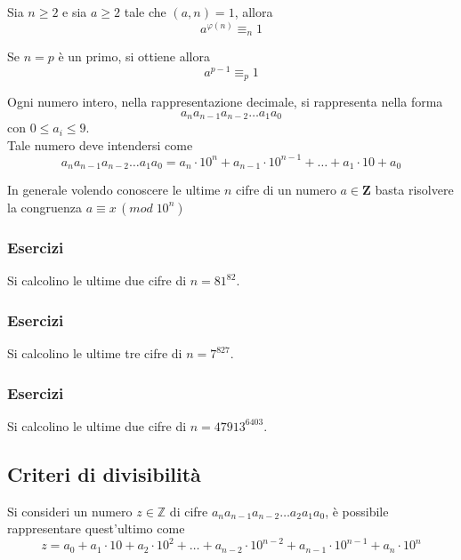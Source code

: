 \begin{flushleft}
\begin{theorem}
Sia $n\geq 2$ e sia $a\geq 2$ tale che $(a,n) = 1$, allora
\[a^{\varphi(n)}\equiv_n 1\]
\end{theorem}
\begin{corollario}
Se $n=p$ è un primo, si ottiene allora
\[a^{p-1} \equiv_p 1\]
\end{corollario}
\begin{osservazione}
Ogni numero intero, nella rappresentazione decimale, si rappresenta nella forma
\[a_n a_{n-1} a_{n-2}\hdots a_{1} a_{0}\]
con $0\leq a_i\leq 9.$\\
Tale numero deve intendersi come
\[a_n a_{n-1} a_{n-2}\hdots a_{1} a_{0} = a_n\cdot 10^n+ a_{n-1}\cdot 10^{n-1}+\hdots+ a_{1}\cdot 10 +a_{0}\]
\end{osservazione}

\begin{criterio}
In generale volendo conoscere le ultime $n$ cifre di un numero $a\in \mathbf{Z}$ basta risolvere la congruenza $a\equiv x\,(mod\;10^n)$
\end{criterio}

\subsubsection{Esercizi}
\begin{esercizio}
Si calcolino le ultime due cifre di $n = 81^{82}$.
\end{esercizio}
\vspace{150px}

\subsubsection{Esercizi}
\begin{esercizio}
Si calcolino le ultime tre cifre di $n= 7^{827}$.
\end{esercizio}
\vspace{150px}

\subsubsection{Esercizi}
\begin{esercizio}
Si calcolino le ultime due cifre di $n = 47913^{6403}$.
\end{esercizio}
\vspace{150px}

\subsection{Criteri di divisibilità}
Si consideri un numero $z\in \mathbb{Z}$ di cifre $a_n a_{n-1} a_{n-2}\hdots a_2a_1a_0$, è possibile rappresentare quest'ultimo come
\[z = a_0 + a_1\cdot 10 + a_2\cdot 10^2+\hdots+a_{n-2}\cdot 10^{n-2} + a_{n-1}\cdot 10^{n-1}+a_n \cdot 10^n\]


\end{flushleft}
